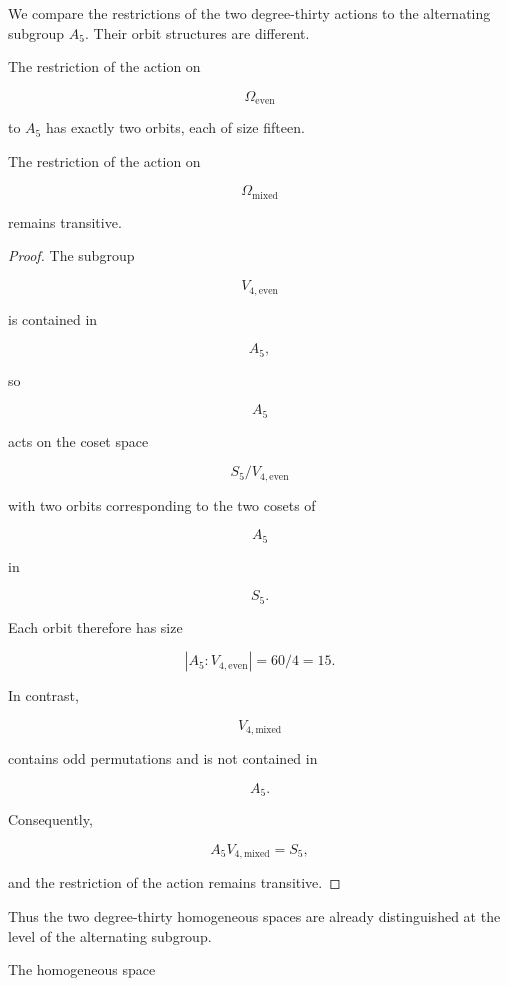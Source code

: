 We compare the restrictions of the two degree-thirty actions to the
alternating subgroup \(A_{5}\). Their orbit structures are different.

\begin{proposition}

The restriction of the action on

\[
\Omega_{\mathrm{even}}
\]

to \(A_{5}\) has exactly two orbits, each of size fifteen.

The restriction of the action on

\[
\Omega_{\mathrm{mixed}}
\]

remains transitive.

\end{proposition}

\begin{proof}

The subgroup

\[
V_{4,\mathrm{even}}
\]

is contained in

\[
A_{5},
\]

so

\[
A_{5}
\]

acts on the coset space

\[
S_{5}/V_{4,\mathrm{even}}
\]

with two orbits corresponding to the two cosets of

\[
A_{5}
\]

in

\[
S_{5}.
\]

Each orbit therefore has size

\[
|A_{5}:V_{4,\mathrm{even}}|
=
60/4
=
15.
\]

In contrast,

\[
V_{4,\mathrm{mixed}}
\]

contains odd permutations and is not contained in

\[
A_{5}.
\]

Consequently,

\[
A_{5}V_{4,\mathrm{mixed}}
=
S_{5},
\]

and the restriction of the action remains transitive.

\end{proof}

Thus the two degree-thirty homogeneous spaces are already distinguished at
the level of the alternating subgroup.

The homogeneous space

